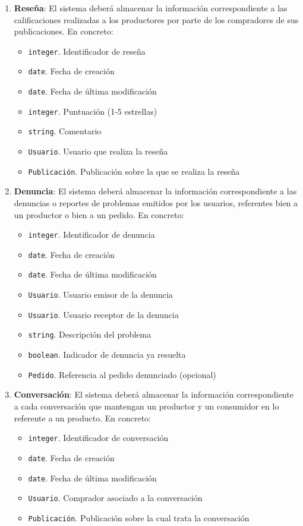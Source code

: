 \begin{enumerate}[label=IRQ-\protect\twodigits{\arabic*}:, align=left, leftmargin=*]
    \item \textbf{Reseña}: El sistema deberá almacenar la información correspondiente a las calificaciones realizadas a los productores por parte de los compradores de sus publicaciones. En concreto:
    \begin{itemize}
        \item \texttt{integer}. Identificador de reseña
        \item \texttt{date}. Fecha de creación
        \item \texttt{date}. Fecha de última modificación
        \item \texttt{integer}. Puntuación (1-5 estrellas)
        \item \texttt{string}. Comentario
        \item \texttt{Usuario}. Usuario que realiza la reseña
        \item \texttt{Publicación}. Publicación sobre la que se realiza la reseña
    \end{itemize}

    \item \textbf{Denuncia}: El sistema deberá almacenar la información correspondiente a las denuncias o reportes de problemas emitidos por los usuarios, referentes bien a un productor o bien a un pedido. En concreto:
    \begin{itemize}
        \item \texttt{integer}. Identificador de denuncia
        \item \texttt{date}. Fecha de creación
        \item \texttt{date}. Fecha de última modificación
        \item \texttt{Usuario}. Usuario emisor de la denuncia
        \item \texttt{Usuario}. Usuario receptor de la denuncia
        \item \texttt{string}. Descripción del problema
        \item \texttt{boolean}. Indicador de denuncia ya resuelta
        \item \texttt{Pedido}. Referencia al pedido denunciado (opcional)
    \end{itemize}

    \item \textbf{Conversación}: El sistema deberá almacenar la información correspondiente a cada conversación que mantengan un productor y un consumidor en lo referente a un producto. En concreto:
    \begin{itemize}
        \item \texttt{integer}. Identificador de conversación
        \item \texttt{date}. Fecha de creación
        \item \texttt{date}. Fecha de última modificación
        \item \texttt{Usuario}. Comprador asociado a la conversación
        \item \texttt{Publicación}. Publicación sobre la cual trata la conversación
    \end{itemize}


\end{enumerate}
